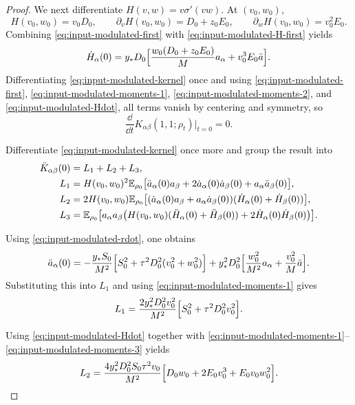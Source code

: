 \begin{proof}
We next differentiate $H(v,w)=v\sigma'(vw)$.
At $(v_0,w_0)$,
\[
  H(v_0,w_0)=v_0D_0,
  \qquad
  \partial_v H(v_0,w_0)=D_0+z_0E_0,
  \qquad
  \partial_w H(v_0,w_0)=v_0^2E_0.
  \label{eq:input-modulated-H-first}
\]
Combining \eqref{eq:input-modulated-first} with \eqref{eq:input-modulated-H-first} yields
\[
  \dot H_\alpha(0)
  =
  y_*D_0
  \Bigl[
    \frac{w_0(D_0+z_0E_0)}{M}a_\alpha
    +
    v_0^3E_0\bar a
  \Bigr].
  \label{eq:input-modulated-Hdot}
\]
Differentiating \eqref{eq:input-modulated-kernel} once and using
\eqref{eq:input-modulated-first},
\eqref{eq:input-modulated-moments-1},
\eqref{eq:input-modulated-moments-2},
and \eqref{eq:input-modulated-Hdot},
all terms vanish by centering and symmetry, so
\[
  \frac{\dd}{\dd t}K_{\alpha\beta}(1,1;\rho_t)\Big|_{t=0}=0.
\]

Differentiate \eqref{eq:input-modulated-kernel} once more and group the result into
\begin{align*}
  \ddot K_{\alpha\beta}(0)
  &=
  L_1+L_2+L_3,
  \\
  L_1
  &=
  H(v_0,w_0)^2
  \mathbb{E}_{\rho_0}
  \bigl[
    \ddot a_\alpha(0)a_\beta
    +
    2\dot a_\alpha(0)\dot a_\beta(0)
    +
    a_\alpha \ddot a_\beta(0)
  \bigr],
  \\
  L_2
  &=
  2H(v_0,w_0)
  \mathbb{E}_{\rho_0}
  \bigl[
    (\dot a_\alpha(0)a_\beta+a_\alpha\dot a_\beta(0))
    (\dot H_\alpha(0)+\dot H_\beta(0))
  \bigr],
  \\
  L_3
  &=
  \mathbb{E}_{\rho_0}
  \bigl[
    a_\alpha a_\beta
    \bigl(
      H(v_0,w_0)(\ddot H_\alpha(0)+\ddot H_\beta(0))
      +
      2\dot H_\alpha(0)\dot H_\beta(0)
    \bigr)
  \bigr].
\end{align*}

Using \eqref{eq:input-modulated-rdot}, one obtains
\[
  \ddot a_\alpha(0)
  =
  -\frac{y_*S_0}{M^2}
  \Bigl[
    S_0^2+\tau^2D_0^2(v_0^2+w_0^2)
  \Bigr]
  +
  y_*^2D_0^2
  \Bigl[
    \frac{w_0^2}{M^2}a_\alpha+\frac{v_0^2}{M}\bar a
  \Bigr].
\]
Substituting this into $L_1$ and using \eqref{eq:input-modulated-moments-1} gives
\begin{equation}
  L_1
  =
  \frac{2y_*^2D_0^2v_0^2}{M^2}
  \Bigl[
    S_0^2+\tau^2D_0^2v_0^2
  \Bigr].
  \label{eq:input-modulated-L1}
\end{equation}

Using \eqref{eq:input-modulated-Hdot} together with \eqref{eq:input-modulated-moments-1}--\eqref{eq:input-modulated-moments-3} yields
\begin{equation}
  L_2
  =
  \frac{4y_*^2D_0^2S_0\tau^2v_0}{M^2}
  \Bigl[
    D_0w_0 + 2E_0v_0^3 + E_0v_0w_0^2
  \Bigr].
  \label{eq:input-modulated-L2}
\end{equation}


\end{proof}
